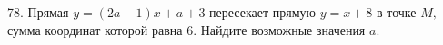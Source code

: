 78. Прямая $y=(2a-1)x+a+3$ пересекает прямую $y=x+8$ в точке $M,$ сумма координат которой равна 6. Найдите возможные значения $a.$\\
